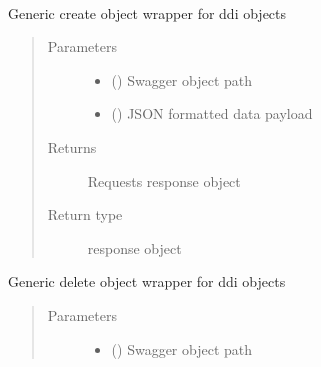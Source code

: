 \documentclass[letterpaper,10pt,english]{sphinxmanual}
\begin{document}
\begin{fulllineitems}
\label{\detokenize{b1tdep-class:bloxone.b1tdep}}~

\begin{fulllineitems}
\label{\detokenize{b1tdep-class:bloxone.b1tdep.create}}
\sphinxAtStartPar
Generic create object wrapper for ddi objects
\begin{quote}\begin{description}
\item[{Parameters}] \leavevmode\begin{itemize}
\item {} 
\sphinxAtStartPar
{} () \textendash{} Swagger object path

\item {} 
\sphinxAtStartPar
{} () \textendash{} JSON formatted data payload

\end{itemize}

\item[{Returns}] \leavevmode
\sphinxAtStartPar
Requests response object

\item[{Return type}] \leavevmode
\sphinxAtStartPar
response object

\end{description}\end{quote}

\end{fulllineitems}


\begin{fulllineitems}
\label{\detokenize{b1tdep-class:bloxone.b1tdep.delete}}
\sphinxAtStartPar
Generic delete object wrapper for ddi objects
\begin{quote}\begin{description}
\item[{Parameters}] \leavevmode\begin{itemize}
\item {} 
\sphinxAtStartPar
{} () \textendash{} Swagger object path


\end{itemize}
\end{description}
\end{quote}
\end{fulllineitems}
\end{fulllineitems}
\end{document}
